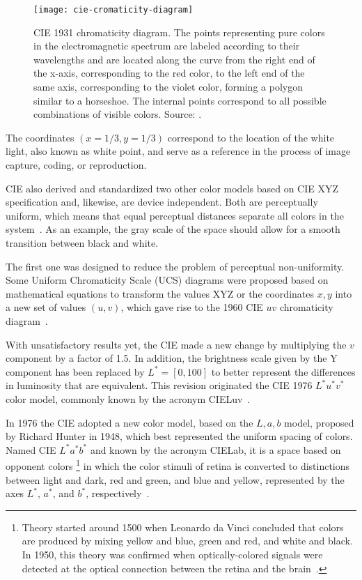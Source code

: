 \begin{figure}[!ht]
  \centering
  \texttt{[image: cie-cromaticity-diagram]}
  \caption[CIE 1931 chromaticity diagram]{CIE 1931 chromaticity diagram. The points representing pure colors in the electromagnetic spectrum are labeled according to their wavelengths and are located along the curve from the right end of the x-axis, corresponding to the red color, to the left end of the same axis, corresponding to the violet color, forming a polygon similar to a horseshoe. The internal points correspond to all possible combinations of visible colors. Source: \citet{ben:09}.}
  \label{fig:cie-cromaticity-diagram} 
\end{figure}

The coordinates $(x = 1/3, y = 1/3)$ correspond to the location of the white light, also known as white point, and serve as a reference in the process of image capture, coding, or reproduction.

CIE also derived and standardized two other color models based on CIE XYZ specification and, likewise, are device independent. Both are perceptually uniform, which means that equal perceptual distances separate all colors in the system~\citep{vezhnevets:03}. As an example, the gray scale of the space should allow for a smooth transition between black and white.

The first one was designed to reduce the problem of perceptual non-uniformity. Some Uniform Chromaticity Scale (UCS) diagrams were proposed based on mathematical equations to transform the values XYZ or the coordinates $x, y$ into a new set of values $(u, v)$, which gave rise to the 1960 CIE $uv$ chromaticity diagram~\citep{gevers:12}.

With unsatisfactory results yet, the CIE made a new change by multiplying the $v$ component by a factor of 1.5. In addition, the brightness scale given by the Y component has been replaced by $L^* = [0, 100]$ to better represent the differences in luminosity that are equivalent. This revision originated the CIE 1976 $L^*u^*v^*$ color model, commonly known by the acronym CIELuv~\citep{gevers:12}.

In 1976 the CIE adopted a new color model, based on the $L, a, b$ model, proposed by Richard Hunter in 1948, which best represented the uniform spacing of colors. Named CIE $L^*a^*b^*$ and known by the acronym CIELab, it is a space based on opponent colors \footnote{Theory started around 1500 when Leonardo da Vinci concluded that colors are produced by mixing yellow and blue, green and red, and white and black. In 1950, this theory was confirmed when optically-colored signals were detected at the optical connection between the retina and the brain~\citep{gevers:12}.} in which the color stimuli of retina is converted to distinctions between light and dark, red and green, and blue and yellow, represented by the axes $L^*$, $a^*$, and $b^*$, respectively~\citep{gevers:12}.


